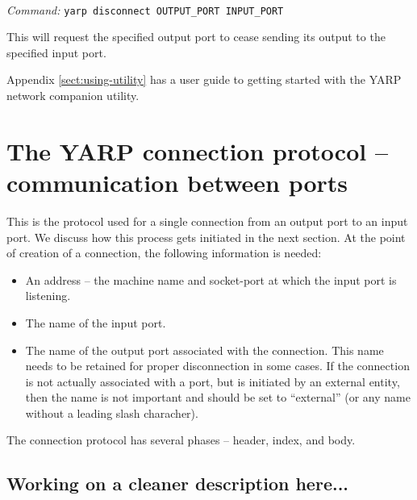 \documentclass[a4]{article}
\newenvironment{packed_itemize}{
\begin{itemize}
  \renewcommand{\labelitemi}{$\triangleright$}
  \setlength{\itemsep}{1pt}
  \setlength{\parskip}{0pt}
  \setlength{\parsep}{0pt}
}{\end{itemize}}
\newcommand{\newusage}{\ \\\noindent\makebox[\textwidth]{\hrulefill}}
\newcommand{\usage}[1]{ \begin{packed_itemize} \item {\it Command:} {\tt #1} \end{packed_itemize}}
\begin{document}
\newusage{}
\usage{yarp disconnect OUTPUT\_PORT INPUT\_PORT}
%
This will request the specified output port to cease sending its output to
the specified input port.

Appendix \ref{sect:using-utility} has a user guide to getting started
with the YARP network companion utility.


\section{The YARP connection protocol -- communication between ports}

This is the protocol used for a single connection from
an output port to an input port.  We discuss how this
process gets initiated in the next section.
At the point of creation of a connection, the
following information is needed:

\begin{itemize}

\item An address -- the machine name and socket-port at which
the input port is listening.

\item The name of the input port.

\item The name of the output port associated with the
connection.  This name
needs to be retained for proper disconnection in some cases.
If the connection is not actually associated with a port,
but is initiated by an external entity, then the name is
not important and should be set to ``external'' (or any
name without a leading slash characher).

\end{itemize}


The connection protocol has several phases -- header,
index, and body.

\subsection{Working on a cleaner description here...}
\end{document}
